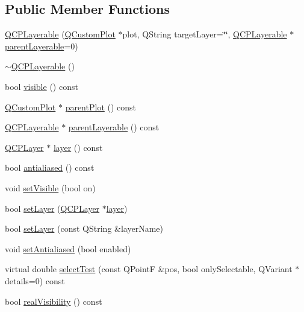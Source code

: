 \subsection*{Public Member Functions}
\begin{DoxyCompactItemize}
\item 
\hyperlink{class_q_c_p_layerable_a76592e80a4657e03da4bfd91aab91ef3}{Q\-C\-P\-Layerable} (\hyperlink{class_q_custom_plot}{Q\-Custom\-Plot} $\ast$plot, Q\-String target\-Layer=\char`\"{}\char`\"{}, \hyperlink{class_q_c_p_layerable}{Q\-C\-P\-Layerable} $\ast$\hyperlink{class_q_c_p_layerable_a98d79f5b716d45eac4347befe546d0ec}{parent\-Layerable}=0)
\item 
\hyperlink{class_q_c_p_layerable_a4231cf5b3601d6d3a5781283e7a9735b}{$\sim$\-Q\-C\-P\-Layerable} ()
\item 
bool \hyperlink{class_q_c_p_layerable_a10a3cc92e0fa63e4a929e61d34e275a7}{visible} () const 
\item 
\hyperlink{class_q_custom_plot}{Q\-Custom\-Plot} $\ast$ \hyperlink{class_q_c_p_layerable_ab7e0e94461566093d36ffc0f5312b109}{parent\-Plot} () const 
\item 
\hyperlink{class_q_c_p_layerable}{Q\-C\-P\-Layerable} $\ast$ \hyperlink{class_q_c_p_layerable_a98d79f5b716d45eac4347befe546d0ec}{parent\-Layerable} () const 
\item 
\hyperlink{class_q_c_p_layer}{Q\-C\-P\-Layer} $\ast$ \hyperlink{class_q_c_p_layerable_aea67e8c19145e70d68c286a36f6b8300}{layer} () const 
\item 
bool \hyperlink{class_q_c_p_layerable_aef5cb4aa899ed9dc9384fd614560291e}{antialiased} () const 
\item 
void \hyperlink{class_q_c_p_layerable_a3bed99ddc396b48ce3ebfdc0418744f8}{set\-Visible} (bool on)
\item 
bool \hyperlink{class_q_c_p_layerable_ab0d0da6d2de45a118886d2c8e16d5a54}{set\-Layer} (\hyperlink{class_q_c_p_layer}{Q\-C\-P\-Layer} $\ast$\hyperlink{class_q_c_p_layerable_aea67e8c19145e70d68c286a36f6b8300}{layer})
\item 
bool \hyperlink{class_q_c_p_layerable_ab25a0e7b897993b44447caee0f142083}{set\-Layer} (const Q\-String \&layer\-Name)
\item 
void \hyperlink{class_q_c_p_layerable_a4fd43e89be4a553ead41652565ff0581}{set\-Antialiased} (bool enabled)
\item 
virtual double \hyperlink{class_q_c_p_layerable_a4001c4d0dfec55598efa4d531f2179a9}{select\-Test} (const Q\-Point\-F \&pos, bool only\-Selectable, Q\-Variant $\ast$details=0) const 
\item 
bool \hyperlink{class_q_c_p_layerable_a30809f7455e9794bca7b6c737622fa63}{real\-Visibility} () const 
\end{DoxyCompactItemize}
